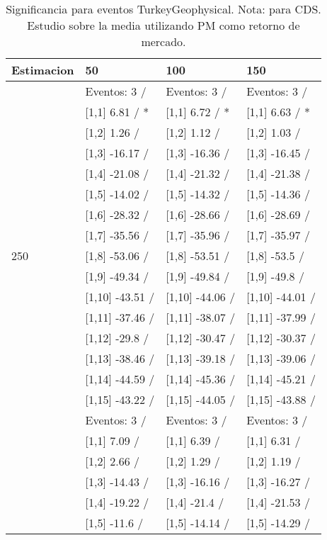 \begin{table}

\caption{Significancia para eventos TurkeyGeophysical. Nota: para CDS. Estudio sobre la media utilizando PM como retorno de mercado.}
\centering
\begin{tabular}[t]{llll}
\toprule
Estimacion & 50 & 100 & 150\\
\midrule
 & Eventos:  3 / & Eventos:  3 / & Eventos:  3 /\\
 & {}[1,1] 6.81  / * & {}[1,1] 6.72  / * & {}[1,1] 6.63  / *\\
 & {}[1,2] 1.26  / & {}[1,2] 1.12  / & {}[1,2] 1.03  /\\
 & {}[1,3] -16.17  / & {}[1,3] -16.36  / & {}[1,3] -16.45  /\\
 & {}[1,4] -21.08  / & {}[1,4] -21.32  / & {}[1,4] -21.38  /\\
\addlinespace
 & {}[1,5] -14.02  / & {}[1,5] -14.32  / & {}[1,5] -14.36  /\\
 & {}[1,6] -28.32  / & {}[1,6] -28.66  / & {}[1,6] -28.69  /\\
 & {}[1,7] -35.56  / & {}[1,7] -35.96  / & {}[1,7] -35.97  /\\
250 & {}[1,8] -53.06  / & {}[1,8] -53.51  / & {}[1,8] -53.5  /\\
 & {}[1,9] -49.34  / & {}[1,9] -49.84  / & {}[1,9] -49.8  /\\
\addlinespace
 & {}[1,10] -43.51  / & {}[1,10] -44.06  / & {}[1,10] -44.01  /\\
 & {}[1,11] -37.46  / & {}[1,11] -38.07  / & {}[1,11] -37.99  /\\
 & {}[1,12] -29.8  / & {}[1,12] -30.47  / & {}[1,12] -30.37  /\\
 & {}[1,13] -38.46  / & {}[1,13] -39.18  / & {}[1,13] -39.06  /\\
 & {}[1,14] -44.59  / & {}[1,14] -45.36  / & {}[1,14] -45.21  /\\
\addlinespace
 & {}[1,15] -43.22  / & {}[1,15] -44.05  / & {}[1,15] -43.88  /\\
 & Eventos:  3 / & Eventos:  3 / & Eventos:  3 /\\
 & {}[1,1] 7.09  / & {}[1,1] 6.39  / & {}[1,1] 6.31  /\\
 & {}[1,2] 2.66  / & {}[1,2] 1.29  / & {}[1,2] 1.19  /\\
 & {}[1,3] -14.43  / & {}[1,3] -16.16  / & {}[1,3] -16.27  /\\
\addlinespace
 & {}[1,4] -19.22  / & {}[1,4] -21.4  / & {}[1,4] -21.53  /\\
 & {}[1,5] -11.6  / & {}[1,5] -14.14  / & {}[1,5] -14.29  /\\

\end{tabular}
\end{table}
